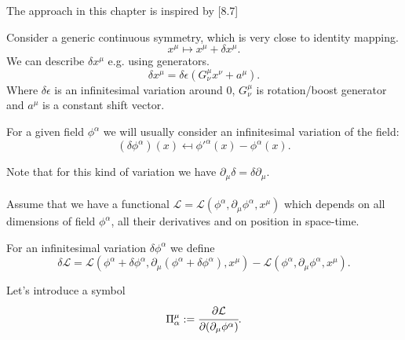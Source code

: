 \documentclass[main.tex]{subfiles}
\begin{document}
The approach in this chapter is inspired by \cite{dauria-trigiante2012}[8.7]

Consider a generic continuous symmetry, which is very close to identity mapping.
\begin{equation}
x^\mu \mapsto x^\mu + \delta x^\mu.
\end{equation}
We can describe $\delta x^\mu$ e.g. using generators.
\begin{equation}
\delta x^\mu = \delta \epsilon (G^\mu_\nu x^\nu + a^\mu). 
\end{equation}
Where $\delta \epsilon$ is an infinitesimal variation around $0$, $G^\mu_\nu$ is rotation/boost generator and $a^\mu$ is a constant shift vector.

For a given field $\phi^\alpha$ we will usually consider an infinitesimal variation of the field:
\begin{equation}
\label{generator-symmetry}
(\delta \phi^\alpha)(x) \mapsfrom \phi'^\alpha(x) - \phi^\alpha(x).
\end{equation}

Note that for this kind of variation we have $\partial_\mu \delta = \delta\partial_\mu$.

\paragraph{}

Assume that we have a functional $\mathcal{L} = \mathcal{L}(\phi^\alpha, \partial_\mu \phi^\alpha, x^\mu)$ which depends on all dimensions of field $\phi^\alpha$, all their derivatives and on position in space-time.

For an infinitesimal variation $\delta \phi^\alpha$ we define
\begin{equation}
\delta \mathcal{L} = \mathcal{L}(\phi^\alpha + \delta \phi^\alpha, \partial_\mu (\phi^\alpha + \delta \phi^\alpha), x^\mu) - \mathcal{L}(\phi^\alpha, \partial_\mu \phi^\alpha, x^\mu).
\end{equation}

Let's introduce a symbol
\begin{equation}
\Pi^\mu_\alpha := \cfrac{\partial \mathcal{L}}{\partial(\partial_\mu \phi^\alpha)}. 
\end{equation}
\end{document}
